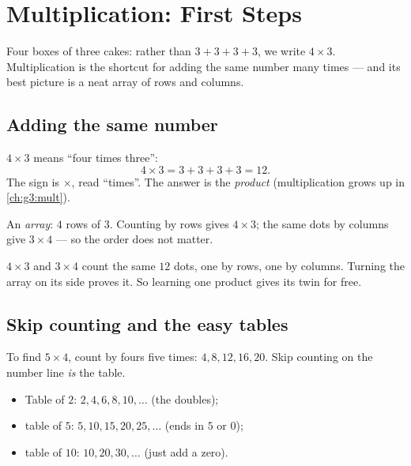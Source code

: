 \chapter{Multiplication: First Steps}\label{ch:g2:mult}

Four boxes of three cakes: rather than $3 + 3 + 3 + 3$, we write
$4 \times 3$. Multiplication is the shortcut for adding the same
number many times --- and its best picture is a neat array of rows
and columns.

\section{Adding the same number}

\begin{definition}[Multiplication]\label{def:g2:mult:def}
$4 \times 3$ means ``four times three'':
\[
4 \times 3 = 3 + 3 + 3 + 3 = 12 .
\]
The sign is $\times$, read ``times''. The answer is the
\emph{product} (multiplication grows up in \cref{ch:g3:mult}).
\end{definition}

\begin{omfigure}

{\small An \emph{array}: $4$ rows of $3$. Counting by rows gives
$4 \times 3$; the same dots by columns give $3 \times 4$ --- so the
order does not matter.}
\end{omfigure}

\begin{example}\label{ex:g2:mult:order}
$4 \times 3$ and $3 \times 4$ count the same $12$ dots, one by
rows, one by columns. Turning the array on its side proves it. So
learning one product gives its twin for free.
\end{example}

\section{Skip counting and the easy tables}

\begin{method}\label{met:g2:mult:skip}
To find $5 \times 4$, count by fours five times:
$4, 8, 12, 16, 20$. Skip counting on the number line \emph{is} the
table.
\begin{itemize}
  \item Table of $2$: $2, 4, 6, 8, 10, \dots$ (the doubles);
  \item table of $5$: $5, 10, 15, 20, 25, \dots$ (ends in $5$ or
        $0$);
  \item table of $10$: $10, 20, 30, \dots$ (just add a zero).
\end{itemize}
\end{method}

